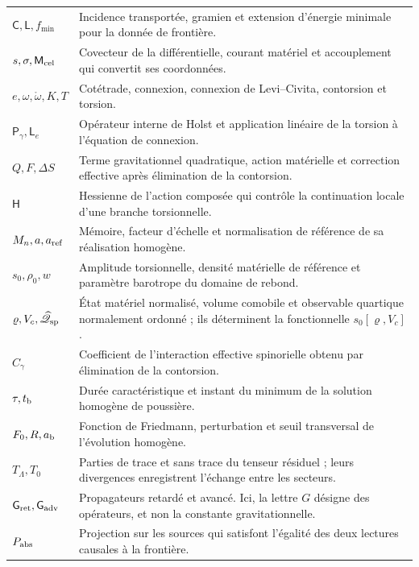 \begin{longtable}{@{}p{.23\linewidth}p{.72\linewidth}@{}}
\(\mathsf C,\mathsf L,f_{\min}\) & Incidence transportée,
gramien et extension d'énergie minimale pour la donnée de frontière.\\
\(s,\sigma,\mathsf M_{\rm cel}\) & Covecteur de la différentielle, courant matériel et accouplement qui convertit ses coordonnées.\\
\(e,\omega,\mathring\omega,K,T\) & Cotétrade, connexion, connexion de
Levi--Civita, contorsion et torsion.\\
\(\mathsf P_\gamma,\mathsf L_e\) & Opérateur interne de Holst et
application linéaire de la torsion à l'équation de connexion.\\
\(Q,F,\Delta S\) & Terme gravitationnel quadratique, action matérielle
et correction effective après élimination de la contorsion.\\
\(\mathsf H\) & Hessienne de l'action composée qui contrôle la continuation locale d'une branche torsionnelle.\\
\(M_n,a,a_{\rm ref}\) & Mémoire, facteur d'échelle et normalisation
de référence de sa réalisation homogène.\\
\(s_0,\rho_0,w\) & Amplitude torsionnelle, densité matérielle de
référence et paramètre barotrope du domaine de rebond.\\
\(\varrho,V_c,\widehat{\mathscr Q}_{\rm sp}\) & État matériel normalisé, volume comobile et observable quartique normalement ordonné ; ils déterminent la fonctionnelle \(s_0[\varrho,V_c]\).\\
\(C_\gamma\) & Coefficient de l'interaction effective spinorielle
obtenu par élimination de la contorsion.\\
\(\tau,t_{\rm b}\) & Durée caractéristique et instant du minimum
de la solution homogène de poussière.\\
\(F_0,R,a_{\rm b}\) & Fonction de Friedmann, perturbation et seuil transversal de l'évolution homogène.\\
\(T_\Lambda,T_0\) & Parties de trace et sans trace du tenseur résiduel ;
leurs divergences enregistrent l'échange entre les secteurs.\\
\(\mathsf{G}_{\rm ret},\mathsf{G}_{\rm adv}\) & Propagateurs retardé et avancé.
Ici, la lettre \(G\) désigne des opérateurs, et non la constante gravitationnelle.\\
\(P_{\rm abs}\) & Projection sur les sources qui satisfont l'égalité des deux lectures causales à la frontière.\\
\bottomrule
\end{longtable}

\par\endgroup
